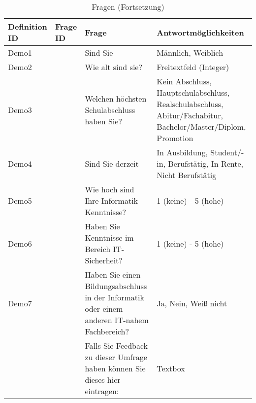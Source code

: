 \begin{table}
	\begin{tabular}[]{ p{1.5cm} | p{1.5cm} | p{5cm} | p{5cm} }
	\hline
	Definition ID & Frage ID & Frage & Antwortmöglichkeiten \\
	\hline \hline
	Demo1 & & Sind Sie & Männlich, Weiblich\\
	\hline
	Demo2 & & Wie alt sind sie? & Freitextfeld (Integer)\\
	\hline
	Demo3 & & Welchen höchsten Schulabschluss haben Sie? & Kein Abschluss, Hauptschulabschluss, Realschulabschluss, Abitur/Fachabitur, Bachelor/Master/Diplom, Promotion\\
	\hline
	Demo4 & & Sind Sie derzeit & In Ausbildung, Student/-in, Berufstätig, In Rente, Nicht Berufstätig\\
	\hline
	Demo5 & & Wie hoch sind Ihre Informatik Kenntnisse? & 1 (keine) - 5 (hohe)\\
	\hline
	Demo6 & & Haben Sie Kenntnisse im Bereich IT-Sicherheit? & 1 (keine) - 5 (hohe)\\
	\hline
	Demo7 & & Haben Sie einen Bildungsabschluss in der Informatik oder einem anderen IT-nahem Fachbereich? & Ja, Nein, Weiß nicht\\
	\hline
	& & Falls Sie Feedback zu dieser Umfrage haben können Sie dieses hier eintragen:& Textbox\\
	\hline
	\end{tabular}
	\caption{Fragen (Fortsetzung)}
\end{table}